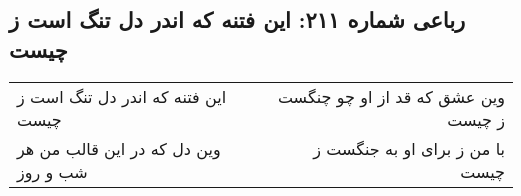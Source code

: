 \begin{center}
\section*{رباعی شماره ۲۱۱: این فتنه که اندر دل تنگ است ز چیست}
\label{sec:0211}
\begin{longtable}{l p{0.5cm} r}
این فتنه که اندر دل تنگ است ز چیست
&&
وین عشق که قد از او چو چنگست ز چیست
\\
وین دل که در این قالب من هر شب و روز
&&
با من ز برای او به جنگست ز چیست
\\
\end{longtable}
\end{center}
